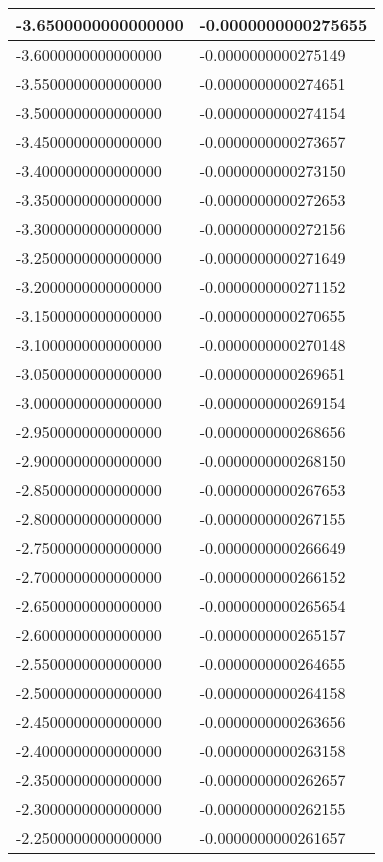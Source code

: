 \documentclass[a4paper,14pt]{article}
\begin{document}
\begin{longtable}{|l|l|}
-3.6500000000000000	&	-0.0000000000275655\\ \hline
-3.6000000000000000	&	-0.0000000000275149\\ \hline
-3.5500000000000000	&	-0.0000000000274651\\ \hline
-3.5000000000000000	&	-0.0000000000274154\\ \hline
-3.4500000000000000	&	-0.0000000000273657\\ \hline
-3.4000000000000000	&	-0.0000000000273150\\ \hline
-3.3500000000000000	&	-0.0000000000272653\\ \hline
-3.3000000000000000	&	-0.0000000000272156\\ \hline
-3.2500000000000000	&	-0.0000000000271649\\ \hline
-3.2000000000000000	&	-0.0000000000271152\\ \hline
-3.1500000000000000	&	-0.0000000000270655\\ \hline
-3.1000000000000000	&	-0.0000000000270148\\ \hline
-3.0500000000000000	&	-0.0000000000269651\\ \hline
-3.0000000000000000	&	-0.0000000000269154\\ \hline
-2.9500000000000000	&	-0.0000000000268656\\ \hline
-2.9000000000000000	&	-0.0000000000268150\\ \hline
-2.8500000000000000	&	-0.0000000000267653\\ \hline
-2.8000000000000000	&	-0.0000000000267155\\ \hline
-2.7500000000000000	&	-0.0000000000266649\\ \hline
-2.7000000000000000	&	-0.0000000000266152\\ \hline
-2.6500000000000000	&	-0.0000000000265654\\ \hline
-2.6000000000000000	&	-0.0000000000265157\\ \hline
-2.5500000000000000	&	-0.0000000000264655\\ \hline
-2.5000000000000000	&	-0.0000000000264158\\ \hline
-2.4500000000000000	&	-0.0000000000263656\\ \hline
-2.4000000000000000	&	-0.0000000000263158\\ \hline
-2.3500000000000000	&	-0.0000000000262657\\ \hline
-2.3000000000000000	&	-0.0000000000262155\\ \hline
-2.2500000000000000	&	-0.0000000000261657\\ \hline

\end{longtable}
\end{document}
